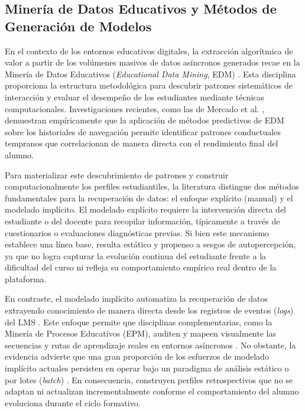 \subsection{Minería de Datos Educativos y Métodos de Generación de Modelos}

En el contexto de los entornos educativos digitales, la extracción algorítmica de valor a partir de los volúmenes masivos de datos asíncronos generados recae en la Minería de Datos Educativos (\textit{Educational Data Mining}, EDM) \cite{Romero2020}. Esta disciplina proporciona la estructura metodológica para descubrir patrones sistemáticos de interacción y evaluar el desempeño de los estudiantes mediante técnicas computacionales. Investigaciones recientes, como las de Mercado et al. \cite{Mercado2024}, demuestran empíricamente que la aplicación de métodos predictivos de EDM sobre los historiales de navegación permite identificar patrones conductuales tempranos que correlacionan de manera directa con el rendimiento final del alumno.

Para materializar este descubrimiento de patrones y construir computacionalmente los perfiles estudiantiles, la literatura distingue dos métodos fundamentales para la recuperación de datos: el enfoque explícito (manual) y el modelado implícito. El modelado explícito requiere la intervención directa del estudiante o del docente para recopilar información, típicamente a través de cuestionarios o evaluaciones diagnósticas previas. Si bien este mecanismo establece una línea base, resulta estático y propenso a sesgos de autopercepción, ya que no logra capturar la evolución continua del estudiante frente a la dificultad del curso ni refleja su comportamiento empírico real dentro de la plataforma. 

En contraste, el modelado implícito automatiza la recuperación de datos extrayendo conocimiento de manera directa desde los registros de eventos (\textit{logs}) del LMS \cite{Supriyanto2025}. Este enfoque permite que disciplinas complementarias, como la Minería de Procesos Educativos (EPM), auditen y mapeen visualmente las secuencias y rutas de aprendizaje reales en entornos asíncronos \cite{AlQaheri2022}. No obstante, la evidencia advierte que una gran proporción de los esfuerzos de modelado implícito actuales persisten en operar bajo un paradigma de análisis estático o por lotes (\textit{batch}) \cite{Setiadi2025}. En consecuencia, construyen perfiles retrospectivos que no se adaptan ni actualizan incrementalmente conforme el comportamiento del alumno evoluciona durante el ciclo formativo. 

